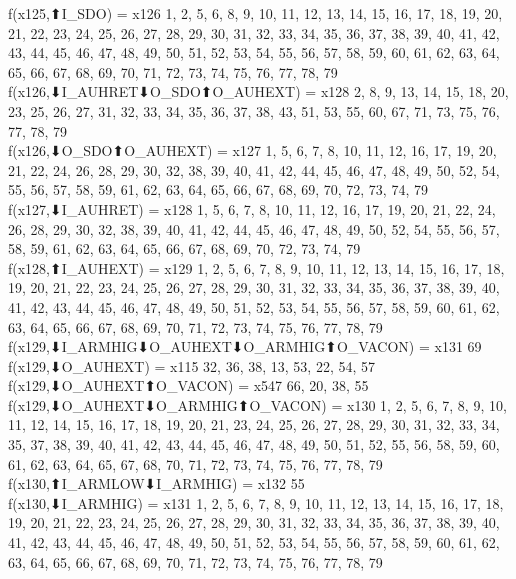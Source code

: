 f(x125,⬆I_SDO) = x126 {1, 2, 5, 6, 8, 9, 10, 11, 12, 13, 14, 15, 16, 17, 18, 19, 20, 21, 22, 23, 24, 25, 26, 27, 28, 29, 30, 31, 32, 33, 34, 35, 36, 37, 38, 39, 40, 41, 42, 43, 44, 45, 46, 47, 48, 49, 50, 51, 52, 53, 54, 55, 56, 57, 58, 59, 60, 61, 62, 63, 64, 65, 66, 67, 68, 69, 70, 71, 72, 73, 74, 75, 76, 77, 78, 79} \\
f(x126,⬇I_AUHRET⬇O_SDO⬆O_AUHEXT) = x128 {2, 8, 9, 13, 14, 15, 18, 20, 23, 25, 26, 27, 31, 32, 33, 34, 35, 36, 37, 38, 43, 51, 53, 55, 60, 67, 71, 73, 75, 76, 77, 78, 79} \\
f(x126,⬇O_SDO⬆O_AUHEXT) = x127 {1, 5, 6, 7, 8, 10, 11, 12, 16, 17, 19, 20, 21, 22, 24, 26, 28, 29, 30, 32, 38, 39, 40, 41, 42, 44, 45, 46, 47, 48, 49, 50, 52, 54, 55, 56, 57, 58, 59, 61, 62, 63, 64, 65, 66, 67, 68, 69, 70, 72, 73, 74, 79} \\
f(x127,⬇I_AUHRET) = x128 {1, 5, 6, 7, 8, 10, 11, 12, 16, 17, 19, 20, 21, 22, 24, 26, 28, 29, 30, 32, 38, 39, 40, 41, 42, 44, 45, 46, 47, 48, 49, 50, 52, 54, 55, 56, 57, 58, 59, 61, 62, 63, 64, 65, 66, 67, 68, 69, 70, 72, 73, 74, 79} \\
f(x128,⬆I_AUHEXT) = x129 {1, 2, 5, 6, 7, 8, 9, 10, 11, 12, 13, 14, 15, 16, 17, 18, 19, 20, 21, 22, 23, 24, 25, 26, 27, 28, 29, 30, 31, 32, 33, 34, 35, 36, 37, 38, 39, 40, 41, 42, 43, 44, 45, 46, 47, 48, 49, 50, 51, 52, 53, 54, 55, 56, 57, 58, 59, 60, 61, 62, 63, 64, 65, 66, 67, 68, 69, 70, 71, 72, 73, 74, 75, 76, 77, 78, 79} \\
f(x129,⬇I_ARMHIG⬇O_AUHEXT⬇O_ARMHIG⬆O_VACON) = x131 {69} \\
f(x129,⬇O_AUHEXT) = x115 {32, 36, 38, 13, 53, 22, 54, 57} \\
f(x129,⬇O_AUHEXT⬆O_VACON) = x547 {66, 20, 38, 55} \\
f(x129,⬇O_AUHEXT⬇O_ARMHIG⬆O_VACON) = x130 {1, 2, 5, 6, 7, 8, 9, 10, 11, 12, 14, 15, 16, 17, 18, 19, 20, 21, 23, 24, 25, 26, 27, 28, 29, 30, 31, 32, 33, 34, 35, 37, 38, 39, 40, 41, 42, 43, 44, 45, 46, 47, 48, 49, 50, 51, 52, 55, 56, 58, 59, 60, 61, 62, 63, 64, 65, 67, 68, 70, 71, 72, 73, 74, 75, 76, 77, 78, 79} \\
f(x130,⬆I_ARMLOW⬇I_ARMHIG) = x132 {55} \\
f(x130,⬇I_ARMHIG) = x131 {1, 2, 5, 6, 7, 8, 9, 10, 11, 12, 13, 14, 15, 16, 17, 18, 19, 20, 21, 22, 23, 24, 25, 26, 27, 28, 29, 30, 31, 32, 33, 34, 35, 36, 37, 38, 39, 40, 41, 42, 43, 44, 45, 46, 47, 48, 49, 50, 51, 52, 53, 54, 55, 56, 57, 58, 59, 60, 61, 62, 63, 64, 65, 66, 67, 68, 69, 70, 71, 72, 73, 74, 75, 76, 77, 78, 79} \\
